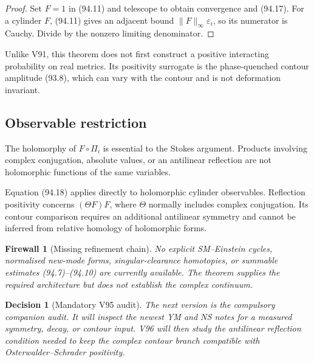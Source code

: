 \documentclass[11pt]{article}
\newtheorem{firewall}[theorem]{Firewall}
\newtheorem{decision}[theorem]{Decision}
\begin{document}
\begin{proof}
Set \(F=1\) in (94.11) and telescope to obtain convergence and
(94.17).  For a cylinder \(F\), (94.11) gives an adjacent bound
\(\|F\|_\infty\varepsilon_i\), so its numerator is Cauchy.  Divide by
the nonzero limiting denominator.
\end{proof}

Unlike V91, this theorem does not first construct a positive
interacting probability on real metrics.  Its positivity surrogate
is the phase-quenched contour amplitude (93.8), which can vary with
the contour and is not deformation invariant.

\subsection{Observable restriction}

The holomorphy of \(F\circ\Pi_i\) is essential to the Stokes argument.
Products involving complex conjugation, absolute values, or an
antilinear reflection are not holomorphic functions of the same
variables.

\begin{warning}
\label{warn:v11v94-OS}
Equation (94.18) applies directly to holomorphic cylinder
observables.  Reflection positivity concerns
\((\Theta F)F\), where \(\Theta\) normally includes complex
conjugation.  Its contour comparison requires an additional
antilinear symmetry and cannot be inferred from relative homology of
holomorphic forms.
\end{warning}

\begin{firewall}[Missing refinement chain]
\label{fire:v11v94-boundary}
No explicit SM--Einstein cycles, normalised new-mode forms,
singular-clearance homotopies, or summable estimates
(94.7)--(94.10) are currently available.  The theorem supplies the
required architecture but does not establish the complex continuum.
\end{firewall}

\begin{decision}[Mandatory V95 audit]
\label{dec:v11v94-next}
The next version is the compulsory companion audit.  It will inspect
the newest YM and NS notes for a measured symmetry, decay, or contour
input.  V96 will then study the antilinear reflection condition needed
to keep the complex contour branch compatible with
Osterwalder--Schrader positivity.
\end{decision}
\end{document}
